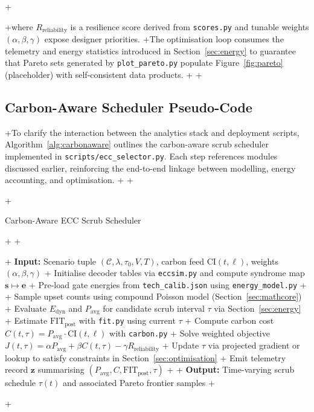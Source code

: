 +\documentclass[conference]{IEEEtran}
\begin{document}
+where $R_{\text{reliability}}$ is a resilience score derived from \texttt{scores.py} and tunable weights $(\alpha,\beta,\gamma)$ expose designer priorities.
+The optimisation loop consumes the telemetry and energy statistics introduced in Section~\ref{sec:energy} to guarantee that Pareto sets generated by \texttt{plot\_pareto.py} populate Figure~\ref{fig:pareto} (placeholder) with self-consistent data products.
+
+\subsection{Carbon-Aware Scheduler Pseudo-Code}
+To clarify the interaction between the analytics stack and deployment scripts, Algorithm~\ref{alg:carbonaware} outlines the carbon-aware scrub scheduler implemented in \texttt{scripts/ecc\_selector.py}. Each step references modules discussed earlier, reinforcing the end-to-end linkage between modelling, energy accounting, and optimisation.
+
+\begin{algorithm}[!t]
+    \caption{Carbon-Aware ECC Scrub Scheduler}
+    \label{alg:carbonaware}
+    \begin{algorithmic}[1]
+        \STATE \textbf{Input:} Scenario tuple $(\mathcal{C}, \lambda, \tau_{0}, V, T)$, carbon feed $\text{CI}(t,\ell)$, weights $(\alpha,\beta,\gamma)$
+        \STATE Initialise decoder tables via \texttt{eccsim.py} and compute syndrome map $\mathbf{s}\mapsto \mathbf{e}$
+        \STATE Pre-load gate energies from \texttt{tech\_calib.json} using \texttt{energy\_model.py}
+        
+            \STATE Sample upset counts using compound Poisson model (Section~\ref{sec:mathcore})
+            \STATE Evaluate $E_{\text{dyn}}$ and $P_{\text{avg}}$ for candidate scrub interval $\tau$ via Section~\ref{sec:energy}
+            \STATE Estimate $\text{FIT}_{\text{post}}$ with \texttt{fit.py} using current $\tau$
+            \STATE Compute carbon cost $C(t,\tau)=P_{\text{avg}} \cdot \text{CI}(t,\ell)$ with \texttt{carbon.py}
+            \STATE Solve weighted objective $J(t,\tau)=\alpha P_{\text{avg}}+\beta C(t,\tau)-\gamma R_{\text{reliability}}$
+            \STATE Update $\tau$ via projected gradient or lookup to satisfy constraints in Section~\ref{sec:optimisation}
+            \STATE Emit telemetry record $\mathbf{z}$ summarising $(P_{\text{avg}}, C, \text{FIT}_{\text{post}}, \tau)$
+        \ENDFOR
+        \STATE \textbf{Output:} Time-varying scrub schedule $\tau(t)$ and associated Pareto frontier samples
+    \end{algorithmic}
+\end{algorithm}
\end{document}
